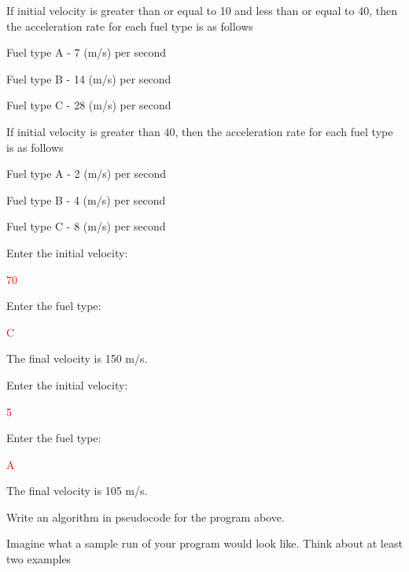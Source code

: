 \vspace{0.25cm}
If initial velocity is greater than or equal to 10 and less than or equal to 40, then the acceleration rate for each fuel type is as follows

    Fuel type A - 7 (m/s) per second
    
    Fuel type B - 14 (m/s) per second
    
    Fuel type C - 28 (m/s) per second
    
\vspace{0.25cm}
If initial velocity is greater than 40, then the acceleration rate for each fuel type is as follows

    Fuel type A - 2 (m/s) per second
    
    Fuel type B - 4 (m/s) per second
    
    Fuel type C - 8 (m/s) per second

\begin{sample}
   Enter the initial velocity:
   
\textcolor{red}{70}

   Enter the fuel type:
   
\textcolor{red}{C}

   The final velocity is 150 m/s.

   

\end{sample}
\begin{sample}
   Enter the initial velocity:
   
 \textcolor{red}{5}
 
   Enter the fuel type:
   
 \textcolor{red}{A}
 
   The final velocity is 105 m/s.


\end{sample}

\begin{multipart}
    Write an algorithm in pseudocode for the program above.
\end{multipart}

\vspace{1.5cm}

\begin{multipart}
    Imagine what a sample run of your program would look like. Think about at least two examples

\end{multipart}

\vspace{2cm}

